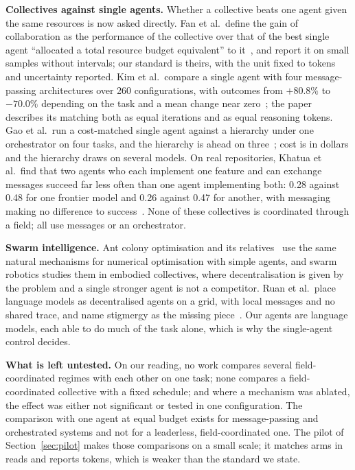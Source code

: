 \documentclass[10pt,twocolumn]{article}
\begin{document}
\textbf{Collectives against single agents.} Whether a collective beats one agent given the same resources is now asked directly. Fan et al.\ define the gain of collaboration as the performance of the collective over that of the best single agent ``allocated a total resource budget equivalent'' to it~\cite{fan2026}, and report it on small samples without intervals; our standard is theirs, with the unit fixed to tokens and uncertainty reported. Kim et al.\ compare a single agent with four message-passing architectures over 260 configurations, with outcomes from $+80.8\%$ to $-70.0\%$ depending on the task and a mean change near zero~\cite{kim2025}; the paper describes its matching both as equal iterations and as equal reasoning tokens. Gao et al.\ run a cost-matched single agent against a hierarchy under one orchestrator on four tasks, and the hierarchy is ahead on three~\cite{gao2026}; cost is in dollars and the hierarchy draws on several models. On real repositories, Khatua et al.\ find that two agents who each implement one feature and can exchange messages succeed far less often than one agent implementing both: 0.28 against 0.48 for one frontier model and 0.26 against 0.47 for another, with messaging making no difference to success~\cite{khatua2026}. None of these collectives is coordinated through a field; all use messages or an orchestrator.

\textbf{Swarm intelligence.} Ant colony optimisation and its relatives~\cite{dorigo1996} use the same natural mechanisms for numerical optimisation with simple agents, and swarm robotics studies them in embodied collectives, where decentralisation is given by the problem and a single stronger agent is not a competitor. Ruan et al.\ place language models as decentralised agents on a grid, with local messages and no shared trace, and name stigmergy as the missing piece~\cite{ruan2025}. Our agents are language models, each able to do much of the task alone, which is why the single-agent control decides.

\textbf{What is left untested.} On our reading, no work compares several field-coordinated regimes with each other on one task; none compares a field-coordinated collective with a fixed schedule; and where a mechanism was ablated, the effect was either not significant or tested in one configuration. The comparison with one agent at equal budget exists for message-passing and orchestrated systems and not for a leaderless, field-coordinated one. The pilot of Section~\ref{sec:pilot} makes those comparisons on a small scale; it matches arms in reads and reports tokens, which is weaker than the standard we state.
\end{document}
